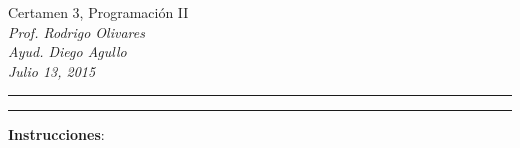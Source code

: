 \documentclass[10pt]{article}
\begin{document}
\begin{center}
    {\Large Certamen 3, Programaci\'on II} \\
    \emph{\small Prof. Rodrigo Olivares} \\
    \emph{\small Ayud. Diego Agullo} \\
    \emph{\scriptsize Julio 13, 2015}
\end{center}
\vspace*{-35pt}
\begin{center}
    \rule{1\textwidth}{.3pt}
\end{center}
\vspace*{-42pt}
\begin{center}
    \rule{1\textwidth}{2pt}
\end{center}

\vspace*{-15pt}
{\small \textbf{Instrucciones}:}
\vspace*{-15pt}
\end{document}
